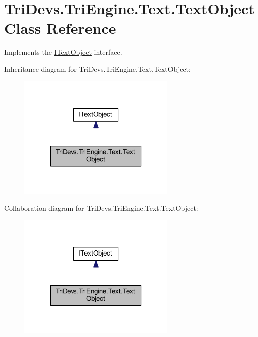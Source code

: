 \hypertarget{class_tri_devs_1_1_tri_engine_1_1_text_1_1_text_object}{\section{Tri\-Devs.\-Tri\-Engine.\-Text.\-Text\-Object Class Reference}
\label{class_tri_devs_1_1_tri_engine_1_1_text_1_1_text_object}
}


Implements the \hyperlink{interface_tri_devs_1_1_tri_engine_1_1_text_1_1_i_text_object}{I\-Text\-Object} interface.  




Inheritance diagram for Tri\-Devs.\-Tri\-Engine.\-Text.\-Text\-Object\-:
\nopagebreak
\begin{figure}[H]
\begin{center}
\leavevmode
\includegraphics[width=214pt]{class_tri_devs_1_1_tri_engine_1_1_text_1_1_text_object__inherit__graph}
\end{center}
\end{figure}


Collaboration diagram for Tri\-Devs.\-Tri\-Engine.\-Text.\-Text\-Object\-:
\nopagebreak
\begin{figure}[H]
\begin{center}
\leavevmode
\includegraphics[width=214pt]{class_tri_devs_1_1_tri_engine_1_1_text_1_1_text_object__coll__graph}
\end{center}
\end{figure}
